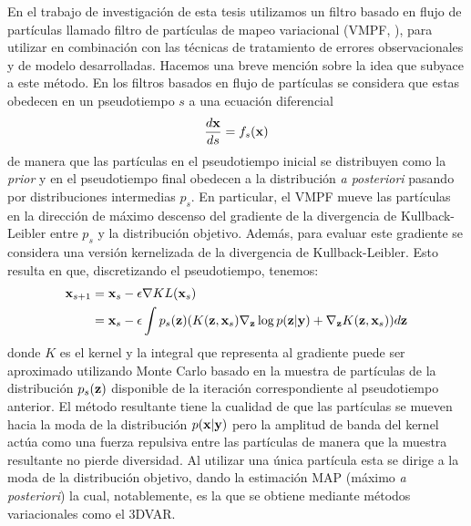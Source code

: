 En el trabajo de investigación de esta tesis utilizamos un filtro basado en flujo de partículas llamado filtro de partículas de mapeo variacional (VMPF, \cite{Pulido2019}), para utilizar en combinación con las técnicas de tratamiento de errores observacionales y de modelo desarrolladas. Hacemos una breve mención sobre la idea que subyace a este método. En los filtros basados en flujo de partículas se considera que estas obedecen en un pseudotiempo $s$ a una ecuación diferencial
\begin{align*}
    \frac{d\mathbf{x}}{ds} = f_s(\mathbf{x})
\end{align*}
de manera que las partículas en el pseudotiempo inicial se distribuyen como la \textit{prior} y en el pseudotiempo final obedecen a la distribución \textit{a posteriori} pasando por distribuciones intermedias $p_s$. En particular, el VMPF mueve las partículas en la dirección de máximo descenso del gradiente de la divergencia de Kullback-Leibler entre $p_s$ y la distribución objetivo. Además, para evaluar este gradiente se considera una versión kernelizada de la divergencia de Kullback-Leibler. Esto resulta en que, discretizando el pseudotiempo, tenemos:
\begin{align*}
    \mathbf{x}_{s+1} &= \mathbf{x}_s - \epsilon \nabla KL(\mathbf{x}_s) \\
    &= \mathbf{x}_s - \epsilon \int p_s(\mathbf{z}) (K(\mathbf{z}, \mathbf{x}_s) \nabla_{\mathbf{z}} \log p(\mathbf{z} | \mathbf{y}) + \nabla_{\mathbf{z}} K(\mathbf{z}, \mathbf{x}_s)) d\mathbf{z}
\end{align*}
donde $K$ es el kernel y la integral que representa al gradiente puede ser aproximado utilizando Monte Carlo basado en la muestra de partículas de la distribución $p_s(\mathbf{z})$ disponible de la iteración correspondiente al pseudotiempo anterior. El método resultante tiene la cualidad de que las partículas se mueven hacia la moda de la distribución $p(\mathbf{x} | \mathbf{y})$ pero la amplitud de banda del kernel actúa como una fuerza repulsiva entre las partículas \citep{Liu2016} de manera que la muestra resultante no pierde diversidad. Al utilizar una única partícula esta se dirige a la moda de la distribución objetivo, dando la estimación MAP (máximo \textit{a posteriori}) la cual, notablemente, es la que se obtiene mediante métodos variacionales como el 3DVAR.

